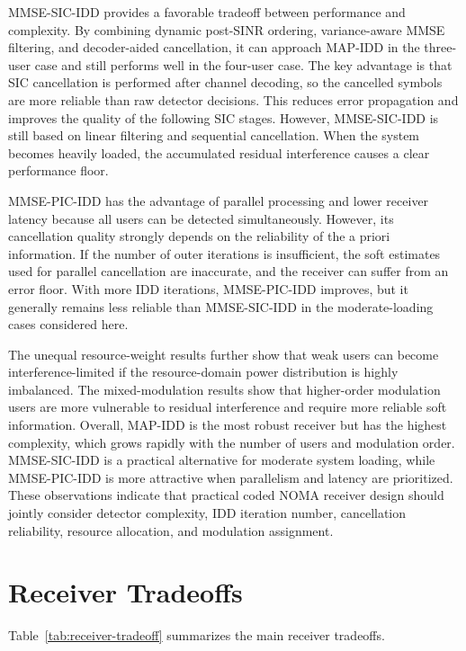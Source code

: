 MMSE-SIC-IDD provides a favorable tradeoff between performance and complexity. By combining dynamic post-SINR ordering, variance-aware MMSE filtering, and decoder-aided cancellation, it can approach MAP-IDD in the three-user case and still performs well in the four-user case. The key advantage is that SIC cancellation is performed after channel decoding, so the cancelled symbols are more reliable than raw detector decisions. This reduces error propagation and improves the quality of the following SIC stages. However, MMSE-SIC-IDD is still based on linear filtering and sequential cancellation. When the system becomes heavily loaded, the accumulated residual interference causes a clear performance floor.

MMSE-PIC-IDD has the advantage of parallel processing and lower receiver latency because all users can be detected simultaneously. However, its cancellation quality strongly depends on the reliability of the a priori information. If the number of outer iterations is insufficient, the soft estimates used for parallel cancellation are inaccurate, and the receiver can suffer from an error floor. With more IDD iterations, MMSE-PIC-IDD improves, but it generally remains less reliable than MMSE-SIC-IDD in the moderate-loading cases considered here.

The unequal resource-weight results further show that weak users can become interference-limited if the resource-domain power distribution is highly imbalanced. The mixed-modulation results show that higher-order modulation users are more vulnerable to residual interference and require more reliable soft information. Overall, MAP-IDD is the most robust receiver but has the highest complexity, which grows rapidly with the number of users and modulation order. MMSE-SIC-IDD is a practical alternative for moderate system loading, while MMSE-PIC-IDD is more attractive when parallelism and latency are prioritized. These observations indicate that practical coded NOMA receiver design should jointly consider detector complexity, IDD iteration number, cancellation reliability, resource allocation, and modulation assignment.



\section{Receiver Tradeoffs}

Table~\ref{tab:receiver-tradeoff} summarizes the main receiver tradeoffs.

